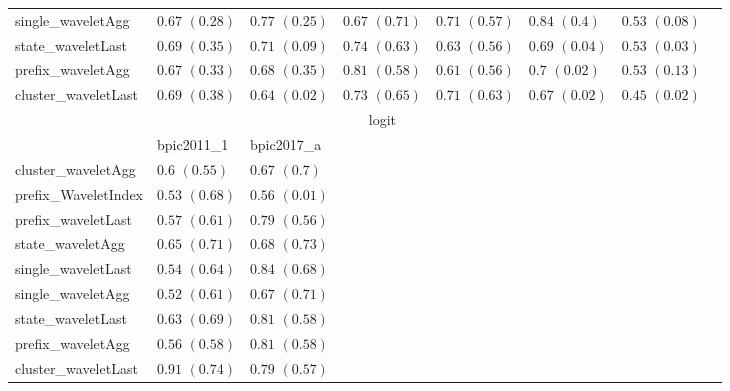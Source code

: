 \documentclass[twoside,11pt]{Latex/Classes/PhDthesisPSnPDF}
\begin{document}
\begin{table}[h]
{\begin{tabular}{llllllll}
				single\_waveletAgg & $0.67$ ${(0.28)}$ & $\mathbf{0.77}$ $\mathbf{(0.25)}$  & $0.67$ ${(0.71)}$ & $0.71$ ${(0.57)}$ & $\mathbf{0.84}$ $\mathbf{(0.4)}$  & $0.53$ ${(0.08)}$ \\
				state\_waveletLast & $0.69$ ${(0.35)}$ & $0.71$ ${(0.09)}$ & $0.74$ ${(0.63)}$ & $0.63$ ${(0.56)}$ & $0.69$ ${(0.04)}$ & $0.53$ ${(0.03)}$ \\
				prefix\_waveletAgg & $0.67$ ${(0.33)}$ & $0.68$ ${(0.35)}$ & $0.81$ ${(0.58)}$ & $0.61$ ${(0.56)}$ & $0.7$ ${(0.02)}$ & $0.53$ ${(0.13)}$ \\
				cluster\_waveletLast & $0.69$ ${(0.38)}$ & $0.64$ ${(0.02)}$ & $0.73$ ${(0.65)}$ & $0.71$ ${(0.63)}$ & $0.67$ ${(0.02)}$ & $0.45$ ${(0.02)}$ \\
				\bottomrule
				\toprule
				& \multicolumn{5}{c}{logit}
				\\
				& bpic2011\_1 & bpic2017\_a
				\\ \midrule
				cluster\_waveletAgg & $0.6$ ${(0.55)}$ & $0.67$ ${(0.7)}$ \\
				prefix\_WaveletIndex & $0.53$ ${(0.68)}$ & $0.56$ ${(0.01)}$ \\
				prefix\_waveletLast & $0.57$ ${(0.61)}$ & $0.79$ ${(0.56)}$ \\
				state\_waveletAgg & $0.65$ ${(0.71)}$ & $0.68$ ${(0.73)}$ \\
				single\_waveletLast & $0.54$ ${(0.64)}$ & $0.84$ ${(0.68)}$ \\
				single\_waveletAgg & $0.52$ ${(0.61)}$ & $0.67$ ${(0.71)}$ \\
				state\_waveletLast & $0.63$ ${(0.69)}$ & $0.81$ ${(0.58)}$ \\
				prefix\_waveletAgg & $0.56$ ${(0.58)}$ & $0.81$ ${(0.58)}$ \\
				cluster\_waveletLast & $0.91$ ${(0.74)}$ & $0.79$ ${(0.57)}$ \\
				\bottomrule
				
		\end{tabular}%
	}
\end{table}

\end{document}
